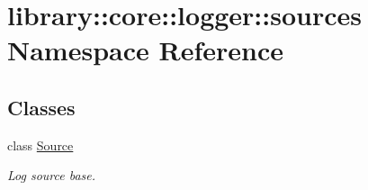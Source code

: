 \hypertarget{namespacelibrary_1_1core_1_1logger_1_1sources}{}\section{library\+::core\+::logger\+::sources Namespace Reference}
\label{namespacelibrary_1_1core_1_1logger_1_1sources}
\subsection*{Classes}
\begin{DoxyCompactItemize}
\item 
class \mbox{\hyperlink{classlibrary_1_1core_1_1logger_1_1sources_1_1_source}{Source}}
\begin{DoxyCompactList}\small\item\em Log source base. \end{DoxyCompactList}\end{DoxyCompactItemize}
